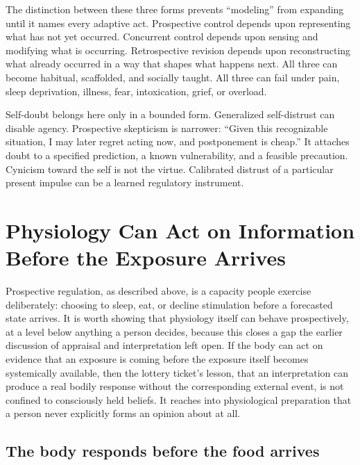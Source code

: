 \documentclass[11pt]{article}
\begin{document}
The distinction between these three forms prevents ``modeling'' from expanding until it names every adaptive act. Prospective control depends upon representing what has not yet occurred. Concurrent control depends upon sensing and modifying what is occurring. Retrospective revision depends upon reconstructing what already occurred in a way that shapes what happens next. All three can become habitual, scaffolded, and socially taught. All three can fail under pain, sleep deprivation, illness, fear, intoxication, grief, or overload.

Self-doubt belongs here only in a bounded form. Generalized self-distrust can disable agency. Prospective skepticism is narrower: ``Given this recognizable situation, I may later regret acting now, and postponement is cheap.'' It attaches doubt to a specified prediction, a known vulnerability, and a feasible precaution. Cynicism toward the self is not the virtue. Calibrated distrust of a particular present impulse can be a learned regulatory instrument.

\section{Physiology Can Act on Information Before the Exposure Arrives}

Prospective regulation, as described above, is a capacity people exercise deliberately: choosing to sleep, eat, or decline stimulation before a forecasted state arrives. It is worth showing that physiology itself can behave prospectively, at a level below anything a person decides, because this closes a gap the earlier discussion of appraisal and interpretation left open. If the body can act on evidence that an exposure is coming before the exposure itself becomes systemically available, then the lottery ticket's lesson, that an interpretation can produce a real bodily response without the corresponding external event, is not confined to consciously held beliefs. It reaches into physiological preparation that a person never explicitly forms an opinion about at all.

\subsection{The body responds before the food arrives}
\end{document}
